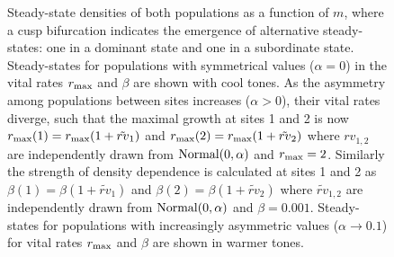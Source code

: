 \documentclass{revtex4}
\begin{document}
\begin{figure}
  \captionsetup{justification=raggedright,
singlelinecheck=false
}
\centering
\caption{
Steady-state densities of both populations as a function of $m$, where a cusp bifurcation indicates the emergence of alternative steady-states: one in a dominant state and one in a subordinate state.
Steady-states for populations with symmetrical values ($\alpha=0$) in the vital rates $r_{\rm max}$ and $\beta$ are shown with cool tones.
As the asymmetry among populations between sites increases ($\alpha>0$), their vital rates diverge, such that the maximal growth at sites 1 and 2 is now $r_{\rm max}(1)=r_{\rm max}(1+\tilde{rv}_1)$ and $r_{\rm max}(2)=r_{\rm max}(1+\tilde{rv}_2)$ where $rv_{1,2}$ are independently drawn from $\rm{Normal}(0,\alpha)$ and $r_{\rm max}=2$. 
Similarly the strength of density dependence is calculated at sites 1 and 2 as $\beta(1)=\beta(1+\tilde{rv}_1)$ and $\beta(2)=\beta(1+\tilde{rv}_2)$ where $\tilde{rv}_{1,2}$ are independently drawn from $\rm{Normal}(0,\alpha)$ and $\beta=0.001$.
Steady-states for populations with increasingly asymmetric values ($\alpha\rightarrow 0.1$) for vital rates $r_{\rm max}$ and $\beta$ are shown in warmer tones.
} \label{fig:symmetry}
\end{figure}
\end{document}
